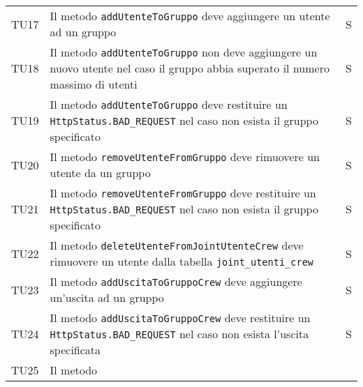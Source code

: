 \begin{center}
{\begin{longtable}{
      |>{\centering\arraybackslash}p{48pt}
      |>{\centering\arraybackslash}p{308pt}
      |>{\centering\arraybackslash}p{27pt}|}
      TU17                                                                       & Il metodo
      \texttt{addUtenteToGruppo} deve aggiungere un utente ad un gruppo          & S                                              \\
      TU18                                                                       & Il metodo
      \texttt{addUtenteToGruppo} non deve aggiungere un nuovo utente nel caso il
      gruppo abbia superato il numero massimo di utenti                          & S                                              \\
      TU19                                                                       & Il metodo
      \texttt{addUtenteToGruppo} deve restituire un \texttt{ HttpStatus.BAD\_REQUEST}
      nel caso non esista il gruppo specificato                                  & S                                              \\
      TU20                                                                       & Il metodo
      \texttt{removeUtenteFromGruppo} deve rimuovere un utente da un gruppo      & S                                              \\
      TU21                                                                       & Il metodo
      \texttt{removeUtenteFromGruppo} deve restituire un \texttt{
      HttpStatus.BAD\_REQUEST} nel caso non esista il gruppo specificato         & S                                              \\
      TU22                                                                       & Il metodo
      \texttt{deleteUtenteFromJointUtenteCrew} deve rimuovere un utente dalla tabella
      \texttt{joint\_utenti\_crew}                                               & S                                              \\
      TU23                                                                       & Il metodo
      \texttt{addUscitaToGruppoCrew} deve aggiungere un'uscita ad un gruppo      & S                                              \\
      TU24                                                                       & Il metodo
      \texttt{addUscitaToGruppoCrew}	deve restituire un
      \texttt{HttpStatus.BAD\_REQUEST} nel caso non esista l'uscita specificata  &
      S                                                                                                                           \\
      TU25                                                                       & Il metodo

\end{longtable}}
\end{center}
